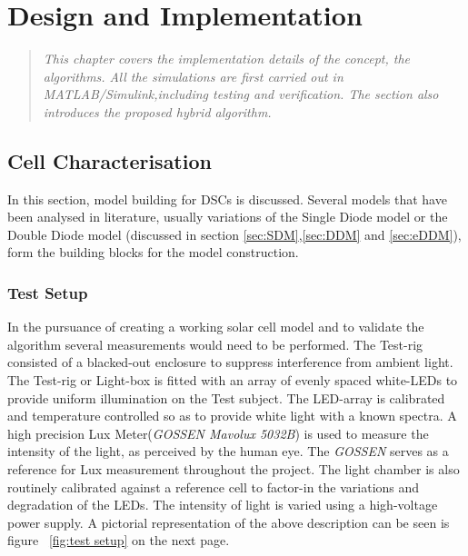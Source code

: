 \chapter{Design and Implementation}
\begin{quote} 
\it This chapter covers the implementation details of the concept, the algorithms. All the simulations are first carried out in MATLAB{\textregistered}/Simulink{\textregistered},including testing and verification. The section also introduces the proposed hybrid algorithm.
\end{quote}

\section{Cell Characterisation}\label{sec:cel_char}
In this section, model building for \ac{DSCs} is discussed. Several models that have been analysed in literature,  usually variations of the Single Diode model or the Double Diode model (discussed in section \ref{sec:SDM},\ref{sec:DDM} and \ref{sec:eDDM}), form the building blocks for the model construction.
 
\subsection{Test Setup}

 In the pursuance of creating a working solar cell model and to validate the algorithm several measurements would need to be performed. The Test-rig consisted of a blacked-out enclosure to suppress interference from ambient light. The Test-rig or Light-box is fitted with an array of evenly spaced white-\ac{LED}s to provide uniform illumination on the Test subject. The \ac{LED}-array is calibrated and temperature controlled so as to provide white light with a known spectra. A high precision Lux Meter(\textit{GOSSEN Mavolux 5032B}) is used to measure the  intensity of the light, as perceived by the human eye. The \textit{GOSSEN} serves as a reference for Lux measurement throughout the project. The light chamber is also routinely calibrated against a reference cell to factor-in the variations and degradation of the \ac{LED}s. The intensity of light is varied using a high-voltage power supply. A pictorial representation of the above description can be seen is figure ~\ref{fig:test setup} on the next page. \\



